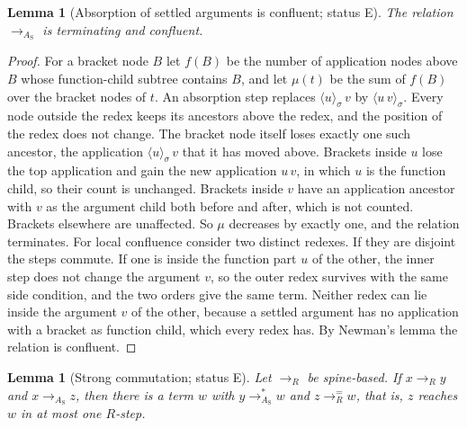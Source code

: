 \documentclass[11pt]{article}
\newtheorem{lemma}[theorem]{Lemma}
\theoremstyle{definition}
\theoremstyle{remark}
\newcommand{\br}[2]{\langle #1\rangle_{#2}}
\newcommand{\Et}{status E}
\begin{document}
\begin{lemma}[Absorption of settled arguments is confluent; \Et]\label{lem:Aconf}
The relation $\to_{A_{\mathrm S}}$ is terminating and confluent.
\end{lemma}

\begin{proof}
For a bracket node $B$ let $f(B)$ be the number of application nodes above $B$ whose function-child subtree contains $B$, and let $\mu(t)$ be the sum of $f(B)$ over the bracket nodes of $t$. An absorption step replaces $\br u\sigma\,v$ by $\br{u\,v}\sigma$. Every node outside the redex keeps its ancestors above the redex, and the position of the redex does not change. The bracket node itself loses exactly one such ancestor, the application $\br u\sigma\,v$ that it has moved above. Brackets inside $u$ lose the top application and gain the new application $u\,v$, in which $u$ is the function child, so their count is unchanged. Brackets inside $v$ have an application ancestor with $v$ as the argument child both before and after, which is not counted. Brackets elsewhere are unaffected. So $\mu$ decreases by exactly one, and the relation terminates. For local confluence consider two distinct redexes. If they are disjoint the steps commute. If one is inside the function part $u$ of the other, the inner step does not change the argument $v$, so the outer redex survives with the same side condition, and the two orders give the same term. Neither redex can lie inside the argument $v$ of the other, because a settled argument has no application with a bracket as function child, which every redex has. By Newman's lemma the relation is confluent.
\end{proof}

\begin{lemma}[Strong commutation; \Et]\label{lem:strongcomm}
Let $\to_R$ be spine-based. If $x\to_R y$ and $x\to_{A_{\mathrm S}}z$, then there is a term $w$ with $y\to_{A_{\mathrm S}}^{*}w$ and $z\to_R^{=}w$, that is, $z$ reaches $w$ in at most one $R$-step.
\end{lemma}
\end{document}
